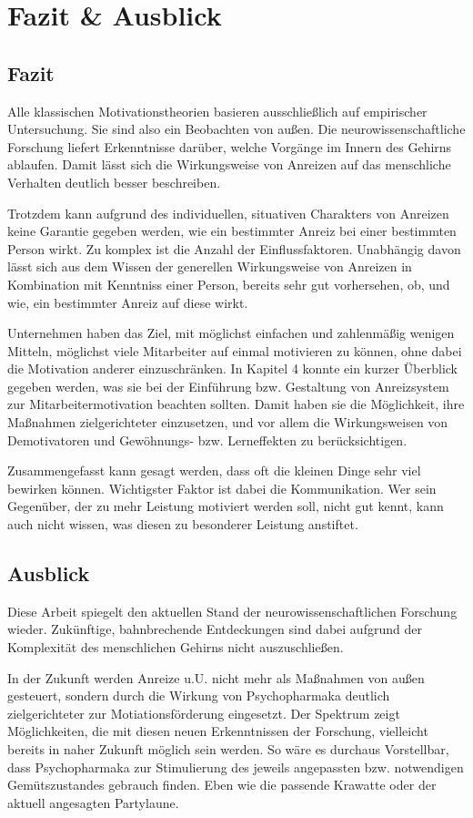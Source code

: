 \newpage
\section{Fazit \& Ausblick} %

\subsection*{Fazit}
Alle klassischen Motivationstheorien basieren ausschließlich auf empirischer Untersuchung. Sie sind also ein Beobachten von außen. Die neurowissenschaftliche Forschung liefert Erkenntnisse darüber, welche Vorgänge im Innern des Gehirns ablaufen. Damit lässt sich die Wirkungsweise von Anreizen auf das menschliche Verhalten deutlich besser beschreiben. 

Trotzdem kann aufgrund des individuellen, situativen Charakters von Anreizen keine Garantie gegeben werden, wie ein bestimmter Anreiz bei einer bestimmten Person wirkt. Zu komplex ist die Anzahl der Einflussfaktoren. Unabhängig davon lässt sich aus dem Wissen der generellen Wirkungsweise von Anreizen in Kombination mit Kenntniss einer Person, bereits sehr gut vorhersehen, ob, und wie, ein bestimmter Anreiz auf diese wirkt.

Unternehmen haben das Ziel, mit möglichst einfachen und zahlenmäßig wenigen Mitteln, möglichst viele Mitarbeiter auf einmal motivieren zu können, ohne dabei die Motivation anderer einzuschränken. In Kapitel 4 konnte ein kurzer Überblick gegeben werden, was sie bei der Einführung bzw. Gestaltung von Anreizsystem zur Mitarbeitermotivation beachten sollten. Damit haben sie die Möglichkeit, ihre Maßnahmen zielgerichteter einzusetzen, und vor allem die Wirkungsweisen von Demotivatoren und Gewöhnungs- bzw. Lerneffekten zu berücksichtigen.

Zusammengefasst kann gesagt werden, dass oft die kleinen Dinge sehr viel bewirken können. Wichtigster Faktor ist dabei die Kommunikation. Wer sein Gegenüber, der zu mehr Leistung motiviert werden soll, nicht gut kennt, kann auch nicht wissen, was diesen zu besonderer Leistung anstiftet.

\subsection*{Ausblick}
Diese Arbeit spiegelt den aktuellen Stand der neurowissenschaftlichen Forschung wieder. Zukünftige, bahnbrechende Entdeckungen sind dabei aufgrund der Komplexität des menschlichen Gehirns nicht auszuschließen. 

In der Zukunft werden Anreize u.U. nicht mehr als Maßnahmen von außen gesteuert, sondern durch die Wirkung von Psychopharmaka deutlich zielgerichteter zur Motiationsförderung eingesetzt. Der Spektrum zeigt Möglichkeiten, die mit diesen neuen Erkenntnissen der Forschung, vielleicht bereits in naher Zukunft möglich sein werden. So wäre es durchaus Vorstellbar, dass Psychopharmaka zur Stimulierung des jeweils angepassten bzw. notwendigen Gemütszustandes gebrauch finden. Eben wie die passende Krawatte oder der aktuell angesagten Partylaune. \citep{Spektrum.2014}




